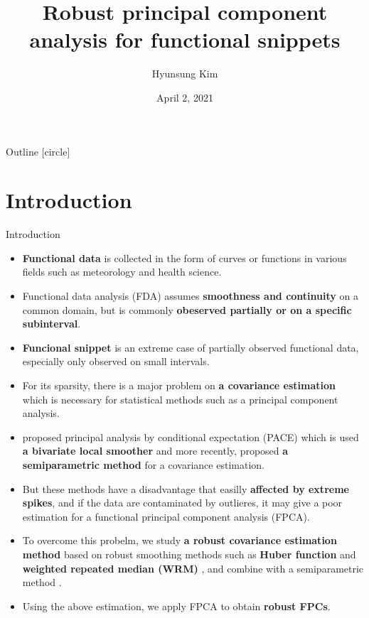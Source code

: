 \documentclass[9pt]{beamer}
\title{Robust principal component analysis for functional snippets}
\date[Short Occasion]{April 2, 2021}
\author{Hyunsung Kim}
\institute[Deptartment of Statistics]{Department of Statistics\\ Chung-Ang University}
\begin{document}
\begin{frame}
  \titlepage
\end{frame}

\begin{frame}{Outline}
	[circle]
	\tableofcontents
\end{frame}


\section{Introduction}

\begin{frame}[allowframebreaks]{Introduction}
	\begin{itemize}
		\item{
			\textbf{Functional data} is collected in the form of curves or functions in various fields such as meteorology and health science.
		}
		\item{
			 Functional data analysis (FDA) assumes \textbf{smoothness and continuity} on a common domain, but is commonly \textbf{obeserved partially or on a specific subinterval}.
		}
		\item{
			\textbf{Funcional snippet} is an extreme case of partially observed functional data, especially only observed on small intervals.
		}
		\item{
			For its sparsity, there is a major problem on \textbf{a covariance estimation} which is necessary for statistical methods such as a principal component analysis.
		}
	
		\pagebreak
		\item{
			\cite{Yao2005} proposed principal analysis by conditional expectation (PACE) which is used \textbf{a bivariate local smoother} and more recently, \cite{Lin2020} proposed \textbf{a semiparametric method} for a covariance estimation.
		}
		\item{
			But these methods have a disadvantage that easilly \textbf{affected by extreme spikes}, and if the data are contaminated by outlieres, it may give a poor estimation for a functional principal component analysis (FPCA).
		}
		\item{
			To overcome this probelm, we study \textbf{a robust covariance estimation method} based on robust smoothing methods such as \textbf{Huber function} \citep{Huber1964} and \textbf{weighted repeated median (WRM)} \citep{Fried2007}, and combine with a semiparametric method \citep{Lin2020}.
		}
		\item{
			Using the above estimation, we apply FPCA to obtain \textbf{robust FPCs}.
		}
	\end{itemize}
\end{frame}
\end{document}
